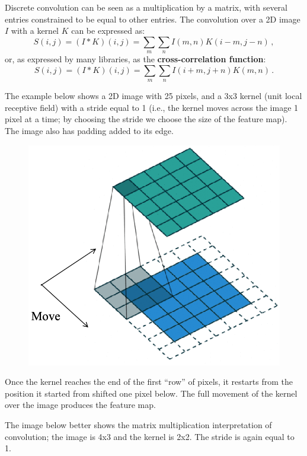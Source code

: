 Discrete convolution can be seen as a multiplication by a matrix, with several entries constrained to be equal to other entries. The convolution over a 2D image $I$ with a kernel $K$ can be expressed as:
\begin{equation*}
    S(i,j) = (I*K)(i,j) = \sum_m \sum_n I(m,n)K(i-m, j-n) \,,
\end{equation*}
or, as expressed by many libraries, as the \textbf{cross-correlation function}:
\begin{equation*}
    S(i,j) = (I*K)(i,j) = \sum_m \sum_n I(i+m,j+n)K(m, n) \,.
\end{equation*}

The example below shows a 2D image with 25 pixels, and a 3x3 kernel (unit local receptive field) with a stride equal to 1 (i.e., the kernel moves across the image 1 pixel at a time; by choosing the stride we choose the size of the feature map). The image also has padding added to its edge.
\begin{figure}[h]
    \centering
    \includegraphics[width=0.6\linewidth]{img/CNN_2D.png} 
\end{figure}

Once the kernel reaches the end of the first ``row'' of pixels, it restarts from the position it started from shifted one pixel below. The full movement of the kernel over the image produces the feature map.

The image below better shows the matrix multiplication interpretation of convolution; the image is 4x3 and the kernel is 2x2. The stride is again equal to 1.

